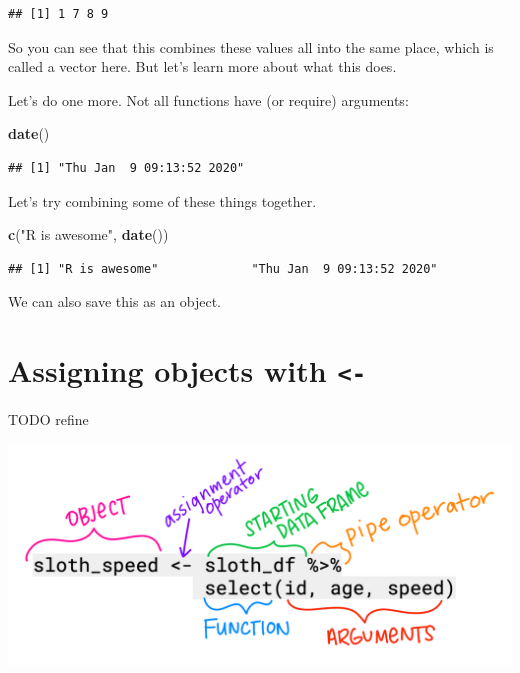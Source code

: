 \documentclass[]{book}
\newenvironment{Shaded}{\begin{snugshade}}{\end{snugshade}}
\newcommand{\KeywordTok}[1]{\textcolor[rgb]{0.13,0.29,0.53}{\textbf{#1}}}
\newcommand{\NormalTok}[1]{#1}
\newcommand{\StringTok}[1]{\textcolor[rgb]{0.31,0.60,0.02}{#1}}
\begin{document}
\begin{verbatim}
## [1] 1 7 8 9
\end{verbatim}

So you can see that this combines these values all into the same place, which is called a vector here. But let's learn more about what this does.

Let's do one more. Not all functions have (or require) arguments:

\begin{Shaded}
\begin{Highlighting}[]
\KeywordTok{date}\NormalTok{()}
\end{Highlighting}
\end{Shaded}

\begin{verbatim}
## [1] "Thu Jan  9 09:13:52 2020"
\end{verbatim}

Let's try combining some of these things together.

\begin{Shaded}
\begin{Highlighting}[]
\KeywordTok{c}\NormalTok{(}\StringTok{"R is awesome"}\NormalTok{, }\KeywordTok{date}\NormalTok{())}
\end{Highlighting}
\end{Shaded}

\begin{verbatim}
## [1] "R is awesome"             "Thu Jan  9 09:13:52 2020"
\end{verbatim}

We can also save this as an object.

\hypertarget{assigning-objects-with--}{%
\section{\texorpdfstring{Assigning objects with \texttt{\textless{}-}}{Assigning objects with \textless{}-}}\label{assigning-objects-with--}}

TODO refine

\includegraphics[width=0.6\linewidth]{img/horst-naming-terms}
\end{document}
